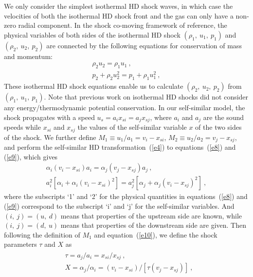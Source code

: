 \documentclass[fleqn,usenatbib]{mnras}
\begin{document}
We only consider the simplest isothermal HD shock waves, in which case the velocities of both the isothermal HD shock front and the gas can only have a non-zero radial component. In the shock co-moving framework of reference, the physical variables of both sides of the isothermal HD shock $(\rho_{1},\ u_{1},\ p_{1})$ and $(\rho_{2},\ u_{2},\ p_{2})$ are connected by the following equations for conservation of mass and momentum:
\begin{gather}
\rho_{2}u_{2}=\rho_{1}u_{1}\ ,\label{e8}\\
p_{2}+\rho_{2}u_{2}^{2}
 =p_{1}+\rho_{1}u_{1}^{2}\ ,\label{e9}
\end{gather}
These isothermal HD shock equations enable us to calculate $(\rho_{2},\ u_{2},\ p_{2})$ from $(\rho_{1},\ u_{1},\ p_{1})$. Note that previous work on isothermal HD shocks did not consider any energy/thermodynamic potential conservation. In our self-similar model, the shock propagates with a speed $u_{s}=a_{i}x_{si}=a_{j}x_{sj}$, where $a_{i}$ and $a_{j}$ are the sound speeds while $x_{si}$ and $x_{sj}$ the values of the self-similar variable $x$ of the two sides of the shock. 
We further define $M_{1}\equiv u_{1}/a_{1}=v_{i}-x_{si}$, $M_{2}\equiv u_{2}/a_{2}=v_{j}-x_{sj}$, and perform the self-similar HD transformation~(\ref{e4}) to equations~(\ref{e8}) and (\ref{e9}), which gives
\begin{gather}
\alpha_{i}(v_{i}-x_{si})a_{i}=\alpha_{j}(v_{j}-x_{sj})a_{j}\ ,\label{e10}\\
a^{2}_{i}\left[\alpha_{i}+\alpha_{i}(v_{i}-x_{si})^{2}\right]=a^{2}_{j}\left[\alpha_{j}+\alpha_{j}(v_{i}-x_{sj})^{2}\right]\ ,\label{e11}
\end{gather}
where the subscripts `1' and `2' for the physical quantities in equations~(\ref{e8}) and (\ref{e9}) correspond to the subscript `i' and `j' for the self-similar variables. And $(i,\ j)=(u,\ d)$ means that properties of the upstream side are known, while $(i,\ j)=(d,\ u)$ means that properties of the downstream side are given.
Then following the definition of $M_{1}$ and equation~(\ref{e10}), we define the shock parameters $\tau$ and $X$ as
\begin{gather}
\begin{split}
&\tau=a_{j}/a_{i}=x_{si}/x_{sj}\ ,\\
&X=\alpha_{j}/\alpha_{i}=(v_{i}-x_{si})/[\tau (v_{j}-x_{sj})]\ ,
\end{split}\label{e12}
\end{gather}
\end{document}
